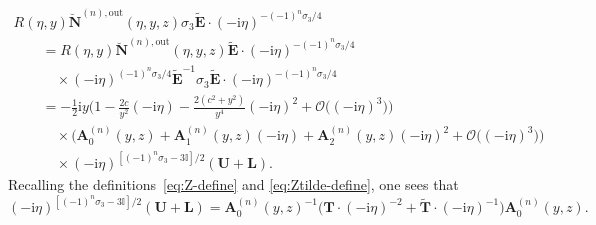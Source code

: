 \documentclass[pdftex]{sigma}
\numberwithin{equation}{section}
\begin{document}
\begin{gather*}
R(\eta,y)\breve{\mathbf{N}}^{(n),\mathrm{out}}(\eta,y,z)\sigma_3\widetilde{\mathbf{E}}\cdot(-\mathrm{i}\eta)^{-(-1)^n\sigma_3/4}\\
\qquad {} =
R(\eta,y)\breve{\mathbf{N}}^{(n),\mathrm{out}}(\eta,y,z)\widetilde{\mathbf{E}}\cdot(-\mathrm{i}\eta)^{-(-1)^n\sigma_3/4}\\
 \qquad\quad{}\times
(-\mathrm{i}\eta)^{(-1)^n\sigma_3/4}\widetilde{\mathbf{E}}^{-1}\sigma_3\widetilde{\mathbf{E}}\cdot(-\mathrm{i}\eta)^{-(-1)^n\sigma_3/4}\\
\qquad{} =-\tfrac{1}{2}\mathrm{i} y \Big(1-\tfrac{2c}{y^2}(-\mathrm{i}\eta) -\tfrac{2(c^2+y^2)}{y^4}(-\mathrm{i}\eta)^2+\mathcal{O}\bigl((-\mathrm{i}\eta)^3\bigr)\Big)\\
 \qquad\quad{}\times\bigl(\mathbf{A}_0^{(n)}(y,z) + \mathbf{A}_1^{(n)}(y,z)(-\mathrm{i}\eta) + \mathbf{A}_2^{(n)}(y,z)(-\mathrm{i}\eta)^2 + \mathcal{O}\bigl((-\mathrm{i}\eta)^3\bigr)\bigr)\\
 \qquad\quad{}\times
(-\mathrm{i}\eta)^{[(-1)^n\sigma_3-3\mathbb{I}]/2}(\mathbf{U}+\mathbf{L}).
\end{gather*}
Recalling the definitions~\eqref{eq:Z-define} and \eqref{eq:Ztilde-define},
one sees that \[
(-\mathrm{i}\eta)^{[(-1)^n\sigma_3-3\mathbb{I}]/2}(\mathbf{U}+\mathbf{L})=\mathbf{A}_0^{(n)}(y,z)^{-1}\bigl(\mathbf{T}\cdot(-\mathrm{i}\eta)^{-2} +\widetilde{\mathbf{T}}\cdot(-\mathrm{i}\eta)^{-1}\bigr)\mathbf{A}_0^{(n)}(y,z).
\]
\pagebreak
\end{document}
